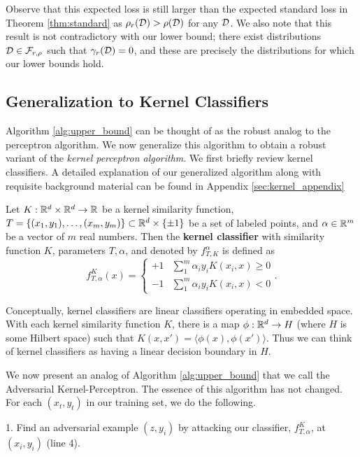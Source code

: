 Observe that this expected loss is still larger than the expected standard loss in  Theorem \ref{thm:standard} as $\rho_r({\mathcal D}) > \rho({\mathcal D})$ for any ${\mathcal D}$. We also note that this result is not contradictory with our lower bound; there exist distributions ${\mathcal D} \in {\mathcal F}_{r, \rho}$ such that $\gamma_r({\mathcal D}) = 0$, and these are precisely the distributions for which our lower bounds hold.

\subsection{Generalization to Kernel Classifiers}

Algorithm \ref{alg:upper_bound} can be thought of as the robust analog to the perceptron algorithm. We now generalize this algorithm to obtain a robust variant of the \textit{kernel perceptron algorithm}. We first briefly review kernel classifiers. A detailed explanation of our generalized algorithm along with requisite background material can be found in Appendix \ref{sec:kernel_appendix}

\begin{defn}\label{defn:kernel}
Let $K: \mathbb R^d \times \mathbb R^d \to \mathbb R$ be a kernel similarity function, $T = \{(x_1, y_1), \dots, (x_m, y_m)\} \subset \mathbb R^d \times \{\pm 1\}$ be a set of labeled points, and $\alpha \in \mathbb R^m$ be a vector of $m$ real numbers. Then the \textbf{kernel classifier} with similarity function $K$, parameters $T, \alpha$, and denoted by $f_{T, K}^\alpha$ is defined as $$f_{T, \alpha}^K(x) = \begin{cases} +1 &  \sum_1^m \alpha_iy_iK(x_i, x) \geq 0\\ -1 &  \sum_1^m \alpha_iy_iK(x_i, x) < 0  \end{cases}.$$
\end{defn}

Conceptually, kernel classifiers are linear classifiers operating in embedded space. With each kernel similarity function $K$, there is a map $\phi: \mathbb R^d \to H$ (where $H$ is some Hilbert space) such that $K(x, x') = \langle \phi(x), \phi(x') \rangle$. Thus we can think of kernel classifiers as having a linear decision boundary in $H$. 

We now present an analog of Algorithm \ref{alg:upper_bound} that we call the Adversarial Kernel-Perceptron. The essence of this algorithm has not changed. For each $(x_t, y_t)$ in our training set, we do the following.

1. Find an adversarial example $(z, y_i)$ by attacking our classifier, $f_{T, \alpha}^K$, at $(x_i, y_i)$ (line 4). 

